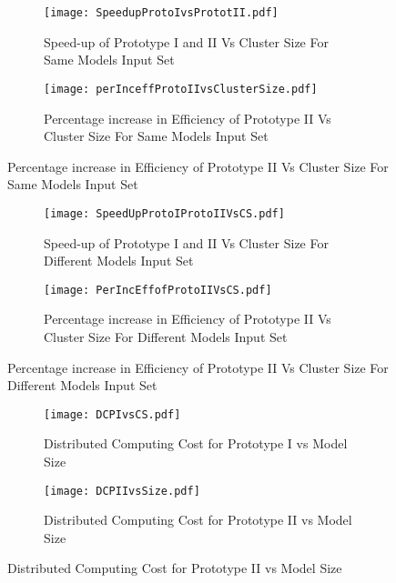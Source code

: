 \begin{figure}
\centering
\captionsetup[subfigure]{labelformat=empty}
\begin{subfigure}
\centering
\texttt{[image: SpeedupProtoIvsPrototII.pdf]}
\caption{Speed-up of Prototype I and II Vs Cluster Size For Same Models Input Set}
\label{fig:SUPIPII}
\end{subfigure}
\begin{subfigure}
\centering
\texttt{[image: perInceffProtoIIvsClusterSize.pdf]}
\caption{ Percentage increase in Efficiency of Prototype II Vs Cluster Size For Same Models Input Set}
\label{fig:perInceffProtoIIvsCS}
\end{subfigure}
\end{figure}

\begin{figure}
\centering
\captionsetup[subfigure]{labelformat=empty}
\begin{subfigure}
\centering
\texttt{[image: SpeedUpProtoIProtoIIVsCS.pdf]}
\caption{Speed-up of Prototype I and II Vs Cluster Size For Different Models Input Set}
\label{fig:SUPIPIvsCS}
\end{subfigure}
\begin{subfigure}
\centering
\texttt{[image: PerIncEffofProtoIIVsCS.pdf]}
\caption{ Percentage increase in Efficiency of Prototype II Vs Cluster Size For Different Models Input Set}
\label{fig:PerIncEffofProtoIIVsCS}
\end{subfigure}
\end{figure}

\begin{figure}
\centering
\captionsetup[subfigure]{labelformat=empty}
\begin{subfigure}
\centering
\texttt{[image: DCPIvsCS.pdf]}
\caption{Distributed Computing Cost for Prototype I vs Model Size}
\label{fig:PIDCCS}
\end{subfigure}
\begin{subfigure}
\centering
\texttt{[image: DCPIIvsSize.pdf]}
\caption{ Distributed Computing Cost for Prototype II vs Model Size}
\label{fig:PIIDCSize}
\end{subfigure}
\end{figure}

